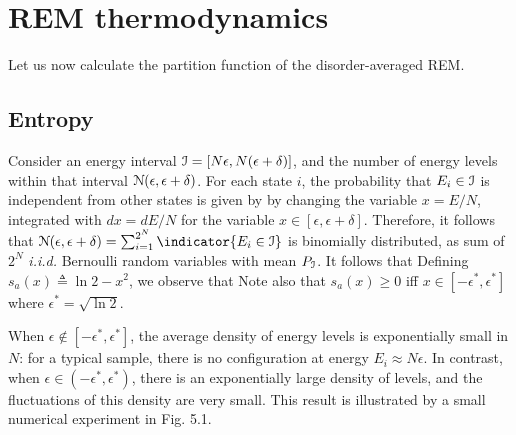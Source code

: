 \documentclass[letterpaper,english,10pt]{article}
\begin{document}
\section{REM thermodynamics}
Let us now calculate the partition function of the disorder-averaged REM. 

\subsection{Entropy}
Consider an energy interval $\mathcal{I} = [N\epsilon, N (\epsilon + \delta)]$, 
and the number of energy levels within that interval $\mathcal{N} (\epsilon, \epsilon + \delta)$. 
For each state $i$, the probability that $E_i \in \mathcal{I}$ is independent from other states is given by 
by changing the variable $x = E/N$, integrated with $dx = dE/N$ for the variable $x \in [\epsilon, \epsilon+\delta]$. 
Therefore, it follows that $\cN (\epsilon, \epsilon + \delta) = \sum_{i=1}^{2^N}\indicator{E_i \in \cI}$ is binomially distributed, as sum of $2^N$ \emph{i.i.d.} Bernoulli random variables with mean $P_{\mathcal{I}}$. 
It follows that 
Defining $s_a(x) \triangleq \ln 2 - x^2$, we observe that 
Note also that $s_a(x) \ge 0$ iff $x \in [-\epsilon^\ast, \epsilon^\ast]$ where $\epsilon^\ast = \sqrt{\ln2}$.  

When $\epsilon \notin [-\epsilon^{\ast}, \epsilon^\ast]$, the average density of energy levels is exponentially small in $N$: for a typical sample, there is no configuration at energy $E_i \approx N\epsilon$. 
In contrast, when $\epsilon \in (-\epsilon^{\ast}, \epsilon^\ast)$, 
there is an exponentially large density of levels, and the fluctuations of this density are very small. 
This result is illustrated by a small numerical experiment in Fig. 5.1. 
\end{document}
